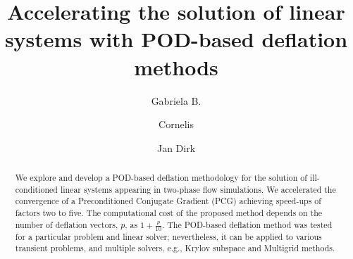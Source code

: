 \documentclass[times,final]{elsarticle}
\begin{document}

\begin{frontmatter}

\title{Accelerating the solution of linear systems with POD-based deflation methods}%

\author[1]{Gabriela B.  }
 
\author[1]{Cornelis  }
\author[2]{Jan Dirk }


\address[1]{Delft University of Technology,
Faculty of Electrical Engineering, Mathematics and Computer Science, Van Mourik Broekmanweg 6, 2628 XE Delft, the Netherlands.}
\address[2]{Delft University of Technology, Faculty of Civil Engineering and Geosciences,
Stevinweg 1, 2628 CN Delft, the Netherlands.}



\begin{abstract}
We explore and develop a POD-based deflation methodology for the solution of ill-conditioned linear systems appearing in two-phase flow simulations. We accelerated the convergence of a Preconditioned Conjugate Gradient (PCG) achieving speed-ups of factors two to five. The computational cost of the proposed method depends on the number of deflation vectors, $p$, as $1+\frac{p}{10}$. 
 The POD-based deflation method was tested for a particular problem and linear solver; nevertheless, it can be applied to various transient 
 problems, and multiple solvers, e.g., Krylov subspace and Multigrid methods. 

\end{abstract}


\end{frontmatter}


\end{document}

